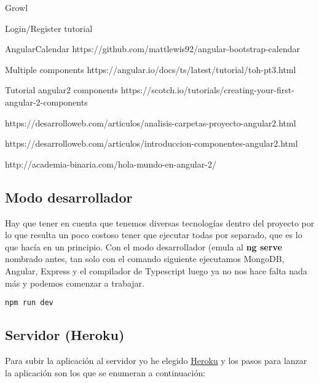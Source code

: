 Growl

Login/Register tutorial

AngularCalendar
https://github.com/mattlewis92/angular-bootstrap-calendar

Multiple components
https://angular.io/docs/ts/latest/tutorial/toh-pt3.html

Tutorial angular2 components
https://scotch.io/tutorials/creating-your-first-angular-2-components

https://desarrolloweb.com/articulos/analisis-carpetas-proyecto-angular2.html


https://desarrolloweb.com/articulos/introduccion-componentes-angular2.html

http://academia-binaria.com/hola-mundo-en-angular-2/


\subsection{Modo desarrollador}

Hay que tener en cuenta que tenemos diversas tecnologías dentro del proyecto por lo que resulta un poco costoso tener que ejecutar todas por separado, que es lo que hacía en un principio. Con el modo desarrollador (emula al \textbf{ng serve} nombrado antes, tan solo con el comando siguiente ejecutamos MongoDB, Angular, Express y el compilador de Typescript luego ya no nos hace falta nada más y podemos comenzar a trabajar. 

	\lstset{language=C, breaklines=true, basicstyle=\footnotesize}
		\begin{lstlisting}[frame=single]
		npm run dev
    	\end{lstlisting}

\subsection{Servidor (Heroku)}
Para subir la aplicación al servidor yo he elegido \href{https://www.heroku.com/}{Heroku} y los pasos para lanzar la aplicación son los que se enumeran a continuación:

